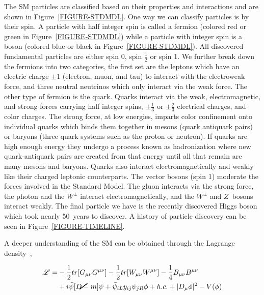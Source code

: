 The SM particles are classified based on their properties and interactions and are shown in Figure~\ref{FIGURE-STDMDL}. One way we can classify particles is by their spin. A particle with half integer spin is called a fermion (colored red or green in Figure~\ref{FIGURE-STDMDL}) while a particle with integer spin is a boson (colored blue or black in Figure~\ref{FIGURE-STDMDL}). All discovered fundamental particles are either spin 0, spin $\frac{1}{2}$ or spin 1. We further break down the fermions into two categories, the first set are the leptons which have an electric charge $\pm 1$ (electron, muon, and tau) to interact with the electroweak force, and three neutral neutrinos which only interact via the weak force. The other type of fermion is the quark. Quarks interact via the weak, electromagnetic, and strong forces carrying half integer spins, $\pm \frac{1}{3}$ or $\pm \frac{2}{3}$ electrical charges, and color charges. The strong force, at low energies, imparts color confinement onto individual quarks which binds them together in mesons (quark antiquark pairs) or baryons (three quark systems such as the proton or neutron). If quarks are high enough energy they undergo a process known as hadronization where new quark-antiquark pairs are created from that energy until all that remain are many mesons and baryons. Quarks also interact electromagnetically and weakly like their charged leptonic counterparts. The vector bosons (spin 1) moderate the forces involved in the Standard Model. The gluon interacts via the strong force, the photon and the $W^\pm$ interact electromagnetically, and the $W^\pm$ and $Z$~bosons interact weakly. The final particle we have is the recently discovered Higgs boson~\cite{Aad:2012tfa} which took nearly 50~years to discover. A history of particle discovery can be seen in Figure~\ref{FIGURE-TIMELINE}. 


A deeper understanding of the SM can be obtained through the Lagrange density~\cite{QFT-PS}, 
 
\begin{equation}
\begin{split}%
\mathscr{L} = & -\frac{1}{2}tr[G_{\mu \nu}G^{\mu \nu}] -\frac{1}{2}tr[W_{\mu \nu}W^{\mu \nu}] -\frac{1}{4} B_{\mu \nu} B^{\mu \nu} \\ 
& + i \bar{\psi} [ \cancel{D} -m] \psi + \bar{\psi}_{iL}y_{ij}\psi_{jR}\phi  +  h.c. +|D_\mu \phi|^2 - V(\phi)
\end{split}%
\label{EQUATION-STDLAG}
\end{equation}

